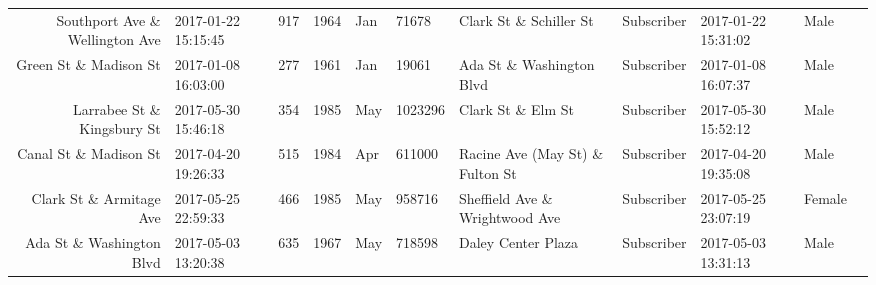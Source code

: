 \documentclass[11pt]{article}
\begin{document}
\begin{tabular}{r|llllllllll}
	 Southport Ave \& Wellington Ave       & 2017-01-22 15:15:45                    &  917                                   & 1964                                   & Jan                                    &   71678                                & Clark St \& Schiller St               & Subscriber                             & 2017-01-22 15:31:02                    & Male                                  \\
	 Green St \& Madison St                & 2017-01-08 16:03:00                    &  277                                   & 1961                                   & Jan                                    &   19061                                & Ada St \& Washington Blvd             & Subscriber                             & 2017-01-08 16:07:37                    & Male                                  \\
	 Larrabee St \& Kingsbury St           & 2017-05-30 15:46:18                    &  354                                   & 1985                                   & May                                    & 1023296                                & Clark St \& Elm St                    & Subscriber                             & 2017-05-30 15:52:12                    & Male                                  \\
	 Canal St \& Madison St                & 2017-04-20 19:26:33                    &  515                                   & 1984                                   & Apr                                    &  611000                                & Racine Ave (May St) \& Fulton St      & Subscriber                             & 2017-04-20 19:35:08                    & Male                                  \\
	 Clark St \& Armitage Ave              & 2017-05-25 22:59:33                    &  466                                   & 1985                                   & May                                    &  958716                                & Sheffield Ave \& Wrightwood Ave       & Subscriber                             & 2017-05-25 23:07:19                    & Female                                \\
	 Ada St \& Washington Blvd           & 2017-05-03 13:20:38                  &  635                                 & 1967                                 & May                                  &  718598                              & Daley Center Plaza                   & Subscriber                           & 2017-05-03 13:31:13                  & Male                                \\

\end{tabular}
\end{document}
